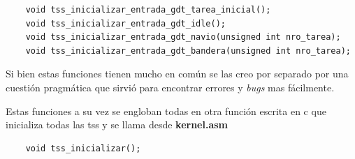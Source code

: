 \begin{verbatim}
	void tss_inicializar_entrada_gdt_tarea_inicial();
	void tss_inicializar_entrada_gdt_idle();
	void tss_inicializar_entrada_gdt_navio(unsigned int nro_tarea);
	void tss_inicializar_entrada_gdt_bandera(unsigned int nro_tarea);
\end{verbatim}

	Si bien estas funciones tienen mucho en común se las creo por separado
por una cuestión pragmática que sirvió para encontrar errores y \textit{bugs} mas
fácilmente.

	Estas funciones a su vez se engloban todas en otra función escrita en c que
inicializa todas las tss y se llama desde \textbf{kernel.asm}


\begin{verbatim}
	void tss_inicializar();
\end{verbatim}





	

